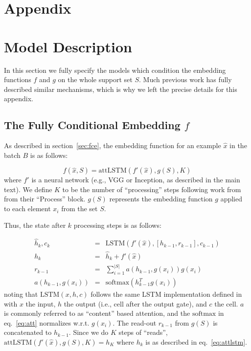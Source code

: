 \pagebreak
\section*{Appendix}
\appendix
\section{Model Description}
In this section we fully specify the models which condition the embedding functions $f$ and $g$ on the whole support set $S$. Much previous work has fully described similar mechanisms, which is why we left the precise details for this appendix.
\subsection{The Fully Conditional Embedding \texorpdfstring{$f$}{f}}
As described in section~\ref{sec:fce}, the embedding function for an example $\hat{x}$ in the batch $B$ is as follows:

\begin{equation*}
f(\hat{x},S) = \text{attLSTM}(f'(\hat{x}), g(S), K)
\end{equation*}
where $f'$ is a neural network (e.g., VGG or Inception, as described in the main text). We define $K$ to be the number of ``processing'' steps following work from \cite{vinyals2015order} from their ``Process'' block. $g(S)$ represents the embedding function $g$ applied to each element $x_i$ from the set $S$.

Thus, the state after $k$ processing steps is as follows:

\begin{eqnarray}
\hat{h}_k, c_k &=& \text{LSTM}(f'(\hat{x}), [h_{k-1}, r_{k-1}], c_{k-1}) \label{eq:attlstm}\\
h_k &=& \hat{h}_k + f'(\hat{x})  \label{eq:skip}\\
r_{k-1} &=& \sum_{i=1}^{|S|} a(h_{k-1}, g(x_i)) g(x_i)\\
a(h_{k-1}, g(x_i)) &=& \text{softmax}(h_{k-1}^T g(x_i))\label{eq:att}
\end{eqnarray}
noting that $\text{LSTM}(x,h,c)$ follows the same LSTM implementation defined in \cite{seq2seqilya} with $x$ the input, $h$ the output (i.e., cell after the output gate), and $c$ the cell. $a$ is commonly referred to as ``content'' based attention, and the $\text{softmax}$ in eq.~\ref{eq:att} normalizes w.r.t. $g(x_i)$. The read-out $r_{k-1}$ from $g(S)$ is concatenated to $h_{k-1}$. Since we do $K$ steps of ``reads'', $\text{attLSTM}(f'(\hat{x}), g(S), K) = h_K$ where $h_k$ is as described in eq.~\ref{eq:attlstm}.


